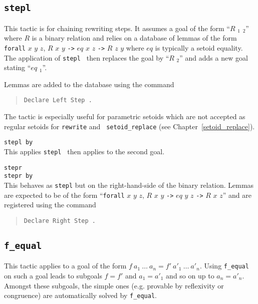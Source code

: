 \begin{coq_example*}
\subsection[{\tt stepl {\term}}]{{\tt stepl {\term}}}

This tactic is for chaining rewriting steps. It assumes a goal of the
form ``$R$ {\term}$_1$ {\term}$_2$'' where $R$ is a binary relation
and relies on a database of lemmas of the form {\tt forall} $x$ $y$
$z$, $R$ $x$ $y$ {\tt ->} $eq$ $x$ $z$ {\tt ->} $R$ $z$ $y$ where $eq$
is typically a setoid equality. The application of {\tt stepl {\term}}
then replaces the goal by ``$R$ {\term} {\term}$_2$'' and adds a new
goal stating ``$eq$ {\term} {\term}$_1$''.

Lemmas are added to the database using the command
\begin{quote}
{\tt Declare Left Step {\term}.}
\end{quote}

The tactic is especially useful for parametric setoids which are not
accepted as regular setoids for {\tt rewrite} and {\tt
  setoid\_replace} (see Chapter~\ref{setoid_replace}).

\begin{Variants}
\item{\tt stepl {\term} by {\tac}}\\
This applies {\tt stepl {\term}} then applies {\tac} to the second goal.

\item{\tt stepr {\term}}\\
     {\tt stepr {\term} by {\tac}}\\
This behaves as {\tt stepl} but on the right-hand-side of the binary relation.
Lemmas are expected to be of the form
``{\tt forall} $x$ $y$
$z$, $R$ $x$ $y$ {\tt ->} $eq$ $y$ $z$ {\tt ->} $R$ $x$ $z$''
and are registered using the command
\begin{quote}
{\tt Declare Right Step {\term}.}
\end{quote}
\end{Variants}


\subsection{\tt f\_equal
\label{f-equal}
}

This tactic applies to a goal of the form $f\ a_1\ \ldots\ a_n = f'\
a'_1\ \ldots\ a'_n$. Using {\tt f\_equal} on such a goal leads to
subgoals $f=f'$ and $a_1=a'_1$ and so on up to $a_n=a'_n$. Amongst
these subgoals, the simple ones (e.g. provable by
reflexivity or congruence) are automatically solved by {\tt f\_equal}.



\end{coq_example*}
